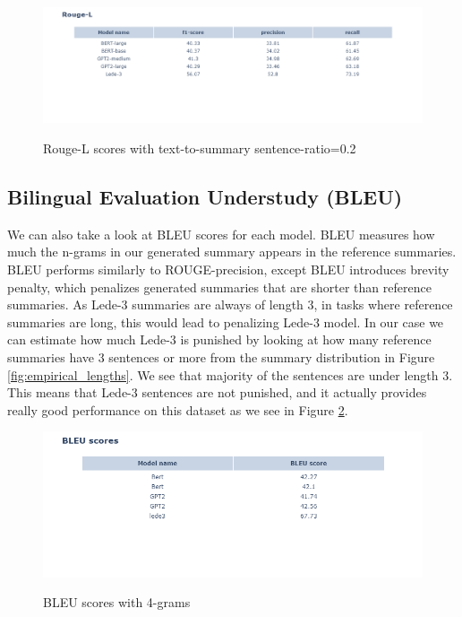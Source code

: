 \documentclass{article}
\begin{document}
\begin{figure}[H]
	\centering
	\hspace*{-3cm}
	\includegraphics[scale=0.55]{rougel.png}\\
	\caption{Rouge-L scores with text-to-summary sentence-ratio=0.2}
	\label{fig:rougel_02}
\end{figure}

\subsection{Bilingual Evaluation Understudy (BLEU)}

\noindent
We can also take a look at BLEU scores for each model. BLEU measures how much the n-grams in our generated summary appears in the reference summaries. BLEU performs similarly to ROUGE-precision, except BLEU introduces brevity penalty, which penalizes generated summaries that are shorter than reference summaries. As Lede-3 summaries are always of length 3, in tasks where reference summaries are long, this would lead to penalizing Lede-3 model. In our case we can estimate how much Lede-3 is punished by looking at how many reference summaries have 3 sentences or more from the summary distribution in Figure \ref{fig:empirical_lengths}. We see that majority of the sentences are under length 3. This means that Lede-3 sentences are not punished, and it actually provides really good performance on this dataset as we see in Figure \ref{fig:bleu}. 

\begin{figure}[H]
	\centering
	\hspace*{-2cm}
	\includegraphics[scale=0.55]{bleu_scores.png}\\
	\caption{BLEU scores with 4-grams}
	\label{fig:bleu}
\end{figure}
\end{document}
